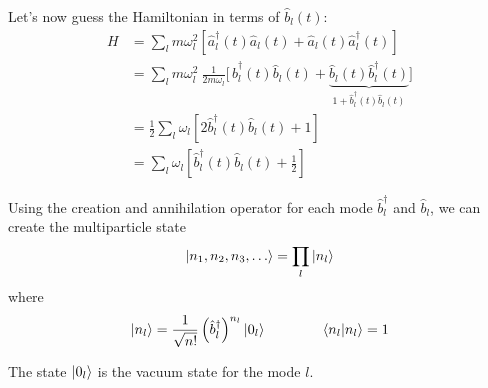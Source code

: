 \documentclass{article}
\begin{document}
\noindent Let's now guess the Hamiltonian in terms of $\hat{b}_l (t)$:
\begin{align*}
    H &= \sum_l m \omega _l ^2 \left[ \hat{a}_l ^\dagger (t) \hat{a}_l (t) + \hat{a}_l (t) \hat{a}_l ^\dagger (t)  \right] \\
    &= \sum_l m \omega _l ^2 ~ \frac{1}{ 2 m \omega_l } \Big[\, \hat{b}_l ^\dagger (t) \hat{b}_l (t) + \underbrace{ \hat{b}_l (t) \hat{b}_l ^\dagger (t) }_{ 1 + \hat{b}_l^\dagger (t) \hat{b}_l (t) } \Big] \\ 
    &= \tfrac{1}{2} \sum_l \omega_l \left[ 2 \hat{b}_l ^\dagger (t) \hat{b}_l (t) + 1 \right] \\
    &= \sum_l \omega_l  \left[ \hat{b}_l ^\dagger (t) \hat{b}_l (t) + \tfrac{1}{2} \right] 
\end{align*}


\noindent Using the creation and annihilation operator for each mode $\hat{b}_l ^\dagger$ and $\hat{b}_l$, we can create the multiparticle state
\begin{equation*}
    \ket{ n_1, n_2, n_3, \dots } = \prod_l \ket{n_l} 
\end{equation*}
where
\begin{equation*}
    \ket{n_l} = \frac{1}{\sqrt{n!}} \left( \hat{b} _l ^\dagger \right)^{n_l} \ket{0_l} %
    \qquad \qquad \braket{ n_l | n_l } = 1
\end{equation*}

\noindent The state $\ket{0_l}$ is the vacuum state for the mode $l$. 
\end{document}
